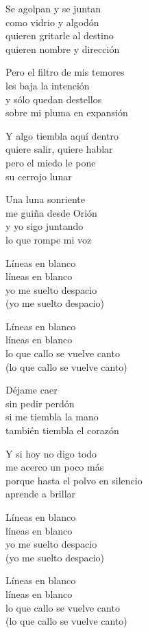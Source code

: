 \begin{lyrics}
Se agolpan y se juntan\\
como vidrio y algodón\\
quieren gritarle al destino\\
quieren nombre y dirección

Pero el filtro de mis temores\\
les baja la intención\\
y sólo quedan destellos\\
sobre mi pluma en expansión

Y algo tiembla aquí dentro\\
quiere salir, quiere hablar\\
pero el miedo le pone\\
su cerrojo lunar

Una luna sonriente\\
me guiña desde Orión\\
y yo sigo juntando\\
lo que rompe mi voz

Líneas en blanco\\
líneas en blanco\\
yo me suelto despacio\\
(yo me suelto despacio)

Líneas en blanco\\
líneas en blanco\\
lo que callo se vuelve canto\\
(lo que callo se vuelve canto)

Déjame caer\\
sin pedir perdón\\
si me tiembla la mano\\
también tiembla el corazón

Y si hoy no digo todo\\
me acerco un poco más\\
porque hasta el polvo en silencio\\
aprende a brillar

Líneas en blanco\\
líneas en blanco\\
yo me suelto despacio\\
(yo me suelto despacio)

Líneas en blanco\\
líneas en blanco\\
lo que callo se vuelve canto\\
(lo que callo se vuelve canto)

\end{lyrics}

